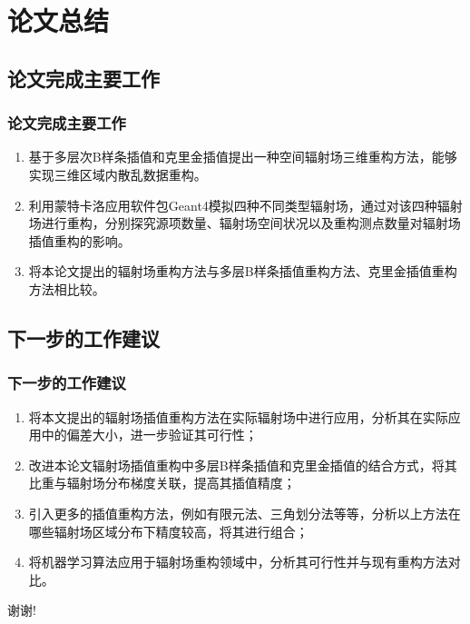 \documentclass{beamer}
\begin{document}
\section{论文总结}

\subsection{论文完成主要工作}
\begin{frame}
    \frametitle{论文完成主要工作}
    \begin{enumerate}
        \item 基于多层次B样条插值和克里金插值提出一种空间辐射场三维重构方法，能够实现三维区域内散乱数据重构。
        \item 利用蒙特卡洛应用软件包Geant4模拟四种不同类型辐射场，通过对该四种辐射场进行重构，分别探究源项数量、辐射场空间状况以及重构测点数量对辐射场插值重构的影响。
        \item 将本论文提出的辐射场重构方法与多层B样条插值重构方法、克里金插值重构方法相比较。
    \end{enumerate}
\end{frame}

\subsection{下一步的工作建议}
\begin{frame}
    \frametitle{下一步的工作建议}
    \begin{enumerate}
        \item 将本文提出的辐射场插值重构方法在实际辐射场中进行应用，分析其在实际应用中的偏差大小，进一步验证其可行性；
        \item 改进本论文辐射场插值重构中多层B样条插值和克里金插值的结合方式，将其比重与辐射场分布梯度关联，提高其插值精度；
        \item 引入更多的插值重构方法，例如有限元法、三角划分法等等，分析以上方法在哪些辐射场区域分布下精度较高，将其进行组合；
        \item 将机器学习算法应用于辐射场重构领域中，分析其可行性并与现有重构方法对比。
    \end{enumerate}
\end{frame}

\begin{frame}
    \Huge{\centerline{谢谢!}}
\end{frame}
\end{document}

